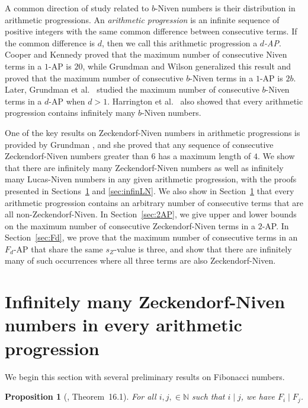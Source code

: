 \documentclass[12pt]{article}
\newtheorem{proposition}[theorem]{Proposition}
\theoremstyle{definition}
\newcommand{\N}{\mathbb{N}}
\begin{document}
A common direction of study related to $b$-Niven numbers is their distribution in arithmetic progressions. An \emph{arithmetic progression} is an infinite sequence of positive integers with the same common difference between consecutive terms. If the common difference is $d$, then we call this arithmetic progression a \emph{$d$-AP}. Cooper and Kennedy \cite{ck1993} proved that the maximum number of consecutive Niven terms in a $1$-AP is $20$, while Grundman \cite{g1994} and Wilson \cite{wilson} generalized this result and proved that the maximum number of consecutive $b$-Niven terms in a $1$-AP is $2b$. Later, Grundman et al.\ \cite{ghw} studied the maximum number of consecutive $b$-Niven terms in a $d$-AP when $d>1$. Harrington et al.\ \cite{hlw} also showed that every arithmetic progression contains infinitely many $b$-Niven numbers.

One of the key results on Zeckendorf-Niven numbers in arithmetic progressions is provided by Grundman \cite{g2007}, and she proved that any sequence of consecutive Zeckendorf-Niven numbers greater than $6$ has a maximum length of $4$. We show that there are infinitely many Zeckendorf-Niven numbers as well as infinitely many Lucas-Niven numbers in any given arithmetic progression, with the proofs presented in Sections~\ref{sec:infinZN} and \ref{sec:infinLN}. We also show in Section~\ref{sec:infinZN} that every arithmetic progression contains an arbitrary number of consecutive terms that are all non-Zeckendorf-Niven. In Section~\ref{sec:2AP}, we give upper and lower bounds on the maximum number of consecutive Zeckendorf-Niven terms in a $2$-AP. In Section~\ref{sec:Fd}, we prove that the maximum number of consecutive terms in an $F_d$-AP that share the same $s_Z$-value is three, and show that there are infinitely many of such occurrences where all three terms are also Zeckendorf-Niven.






\section{Infinitely many Zeckendorf-Niven numbers in every arithmetic progression}\label{sec:infinZN}

We begin this section with several preliminary results on Fibonacci numbers.

\begin{proposition}[\cite{koshy}, Theorem~16.1]\label{prop:Fi|Fj}
For all $i,j,\in\N$ such that $i\mid j$, we have $F_i\mid F_j$.
\end{proposition}
\end{document}
